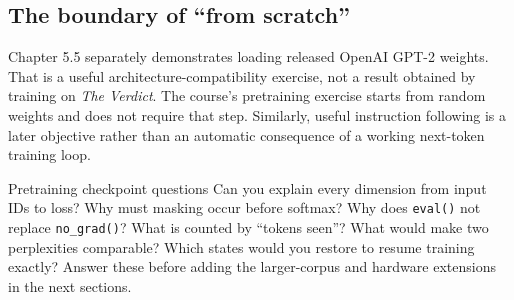 \subsection{The boundary of ``from scratch''}
Chapter 5.5 separately demonstrates loading released OpenAI GPT-2 weights.
That is a useful architecture-compatibility exercise, not a result obtained by
training on \emph{The Verdict}. The course's pretraining exercise starts from
random weights and does not require that step. Similarly, useful instruction
following is a later objective rather than an automatic consequence of a
working next-token training loop.

\begin{studybox}{Pretraining checkpoint questions}
Can you explain every dimension from input IDs to loss? Why must masking occur
before softmax? Why does \texttt{eval()} not replace \texttt{no\_grad()}?
What is counted by ``tokens seen''? What would make two perplexities comparable?
Which states would you restore to resume training exactly? Answer these before
adding the larger-corpus and hardware extensions in the next sections.
\end{studybox}
